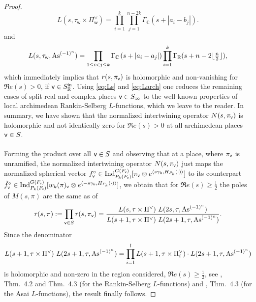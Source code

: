\documentclass[a4paper,10pt]{amsart}
\theoremstyle{definition}
\numberwithin{equation}{section}
\def\R{\mathbb R}
\def\ww{\mathsf w}
\def\vv{{\sf v}} %
\begin{document}
\begin{proof}
\begin{equation}\label{eq:Larch}
L(s,\tau_\ww\times\Pi_\ww^\vee)
=
\prod_{i=1}^k\prod_{j=1}^{n-2k}
\Gamma_{\mathbb C}
\left(
s+{|a_i-b_j|}
\right).
\end{equation}
and
$$
L(s,\tau_\ww,{\rm As}^{(-1)^n})
=
\prod_{1\le i<j\le k}
\Gamma_{\mathbb C}
\left(
s+{|a_i-a_j|}
\right)
\prod_{i=1}^k
\Gamma_{\mathbb R}(s+n-2\lfloor\tfrac{n}{2}\rfloor),
$$
which immediately implies that $r(s,\pi_\vv)$ is holomorphic and non-vanishing for $\Re e(s)>0$, if $\vv\in S^{\sf in}_\R$. Using \eqref{eq:Ls} and \eqref{eq:Larch} one reduces the remaining cases of split real and complex places $\vv\in S_\infty$ to the well-known properties of local archimedean Rankin-Selberg $L$-functions, which we leave to the reader. In summary, we have shown that the normalized intertwining operator $N(s,\pi_\vv)$ is holomorphic and not identically zero for $\Re e(s)>0$ at all archimedean places $\vv\in S$.\\\\
Forming the product over all $\vv\in S$ and observing that at a place, where $\pi_\vv$ is unramified, the normalized intertwining operator $N(s,\pi_\vv)$ just maps the normalized spherical vector $f^\circ_\vv\in {\rm Ind}_{P_k(F_\vv)}^{G(F_\vv)}[\pi_\vv\otimes e^{\langle s\gamma_k,H_{P_k}(\cdot)\rangle}]$ to its counterpart $\tilde f^\circ_\vv\in {\rm Ind}_{P_k(F_\vv)}^{G(F_\vv)}[w_k(\pi)_\vv\otimes e^{\langle -s\gamma_k,H_{P_k}(\cdot)\rangle}]$, we obtain that for $\Re e(s)\geq\frac12$ the poles of $M(s,\pi)$ are the same as of
$$r(s,\pi):=\prod_{\vv\in S}r(s,\pi_\vv)=\frac{ L(s,\tau\times \Pi^\vee) \ L(2s, \tau, {\rm As}^{(-1)^n})}{ L(s+1,\tau\times \Pi^\vee) \ L(2s+1, \tau, {\rm As}^{(-1)^n})}.$$
Since the denominator 
$$L(s+1,\tau\times \Pi^\vee) \ L(2s+1, \tau, {\rm As}^{(-1)^n})=\prod_{i=1}^l L(s+1,\tau\times \Pi_i^\vee) \cdot L(2s+1, \tau, {\rm As}^{(-1)^n})$$ 
is holomorphic and non-zero in the region considered, $\Re e(s)\geq\frac12$, see \cite{cogdel}, Thm.\ 4.2 and Thm.\ 4.3 (for the Rankin-Selberg $L$-functions) and \cite{grbacshahidi}, Thm.\ 4.3 (for the Asai $L$-functions), the result finally follows.
\end{proof}
\end{document}
